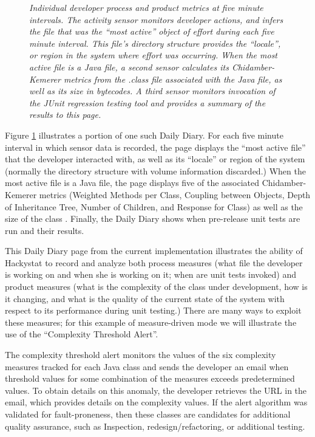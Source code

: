\begin{figure}[t]
 {\centerline {}}
 \caption{{\small \em Individual developer process and product metrics at five
 minute intervals.
The activity sensor monitors developer actions, and infers the file that
was the ``most
active'' object of effort during each five minute interval.  This file's
directory structure provides the ``locale'', or region in the system where
effort was occurring. When the most active file is a Java file, a second sensor
calculates its Chidamber-Kemerer metrics from the .class file associated with
the Java file, as well as its size in bytecodes. A third sensor monitors
invocation of the JUnit regression testing tool and provides a summary of the
results to this page.}}
 \label{fig:DailyDiary}
\end{figure}

Figure \ref{fig:DailyDiary} illustrates a portion of one such Daily Diary.  For each
five minute interval in which sensor data is recorded, the page displays
the ``most active file'' that the developer interacted with, as well as its
``locale'' or region of the system (normally the directory structure with
volume information discarded.)  When the most active file is a Java file,
the page displays five of the associated Chidamber-Kemerer metrics
(Weighted Methods per Class, Coupling between Objects, Depth of Inheritance
Tree, Number of Children, and Response for Class) as well as the size of
the class 
.
Finally, the Daily Diary shows when pre-release unit tests are run and their
results. 

This Daily Diary page from the current implementation illustrates the
ability of Hackystat to record and analyze both process measures (what file
the developer is working on and when she is working on it; when are unit
tests invoked) and product measures (what is the complexity of the class
under development, how is it changing, and what is the quality of the
current state of the system with respect to its performance during unit
testing.)  There are many ways to exploit these measures; for this
example of measure-driven mode we will illustrate the use of the
``Complexity Threshold Alert''.    

The complexity threshold alert monitors the values of the six complexity
measures tracked for each Java class and sends the developer an email when
threshold values for some combination of the measures exceeds predetermined
values.  To obtain details on this anomaly, the developer retrieves the
URL in the email, which provides details on the complexity values. 
If the alert algorithm was validated for
fault-proneness, then these classes are candidates for additional quality
assurance, such as Inspection, redesign/refactoring, or additional testing.

